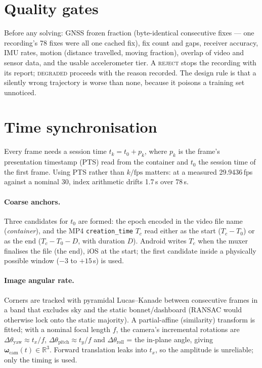 \documentclass[10pt,a4paper]{article}
\newcommand{\R}{\mathbb{R}}
\begin{document}
\section{Quality gates}
Before any solving: GNSS frozen fraction (byte-identical consecutive fixes --- one recording's 78 fixes were
all one cached fix), fix count and gaps, receiver accuracy, IMU rates, motion (distance travelled, moving
fraction), overlap of video and sensor data, and the usable accelerometer tier. A \textsc{reject} stops the
recording with its report; \textsc{degraded} proceeds with the reason recorded. The design rule is that a
silently wrong trajectory is worse than none, because it poisons a training set unnoticed.

\section{Time synchronisation}
\label{sec:sync}

Every frame needs a session time $t_k = t_0 + p_k$, where $p_k$ is the frame's presentation timestamp
(PTS) read from the container and $t_0$ the session time of the first frame. Using PTS rather than
$k/\text{fps}$ matters: at a measured 29.9436\,fps against a nominal 30, index arithmetic drifts 1.7\,s over
78\,s.

\paragraph{Coarse anchors.} Three candidates for $t_0$ are formed: the epoch encoded in the video file
name (\emph{container}), and the MP4 \texttt{creation\_time} $T_c$ read either as the start
($T_c - T_0$) or as the end ($T_c - T_0 - D$, with duration $D$). Android writes $T_c$ when the muxer
finalises the file (the end), iOS at the start; the first candidate inside a physically possible window
($-3$ to $+15$\,s) is used.

\paragraph{Image angular rate.} Corners are tracked with pyramidal Lucas--Kanade between consecutive frames
in a band that excludes sky and the static bonnet/dashboard (RANSAC would otherwise lock onto the static
majority). A partial-affine (similarity) transform is fitted; with a nominal focal length $f$, the camera's
incremental rotations are $\Delta\theta_\text{yaw} \approx t_x/f$, $\Delta\theta_\text{pitch} \approx t_y/f$
and $\Delta\theta_\text{roll}$ = the in-plane angle, giving $\bm\omega_\text{cam}(t) \in \R^3$. Forward
translation leaks into $t_x$, so the amplitude is unreliable; only the timing is used.
\end{document}
